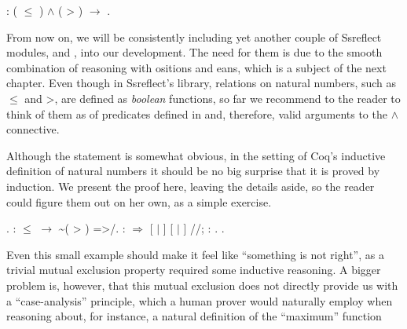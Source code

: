 \begin{coqdoccode}
\coqdocemptyline
\coqdocnoindent
{}   : ( \ensuremath{\le} ) \ensuremath{\land} ( > ) \ensuremath{\rightarrow} .\coqdoceol
\coqdocemptyline
\end{coqdoccode}


From now on, we will be consistently including yet another couple of
Ssreflect modules,  and ,
 into our development. The need for them
is due to the smooth combination of reasoning with ositions and
eans, which is a subject of the next chapter. Even though in
Ssreflect's library, relations on natural numbers, such as \ensuremath{\le} and
>, are defined as \textit{boolean} functions, so far we recommend to the
reader to think of them as of predicates defined in  and,
therefore, valid arguments to the \ensuremath{\land} connective.


Although the statement is somewhat obvious, in the setting of Coq's
inductive definition of natural numbers it should be no big surprise
that it is proved by induction. We present the proof here, leaving the
details aside, so the reader could figure them out on her own, as a
simple exercise.\ssrtl{//}


\begin{coqdoccode}
\coqdocemptyline
\coqdocnoindent
{}.\coqdoceol
\coqdocnoindent
{} :  \ensuremath{\le}  \ensuremath{\rightarrow} \~{}( > )  =>/.\coqdoceol
\coqdocnoindent
{} :   \ensuremath{\Rightarrow} [ \ensuremath{|}   ] [ \ensuremath{|} ] //; :  .\coqdoceol
\coqdocnoindent
{}.\coqdoceol
\coqdocemptyline
\end{coqdoccode}


Even this small example should make it feel like ``something is not
right'', as a trivial mutual exclusion property required some inductive
reasoning. A bigger problem is, however, that this mutual exclusion
does not directly provide us with a ``case-analysis'' principle, which a
human prover would naturally employ when reasoning about, for
instance, a natural definition of the ``maximum'' function


